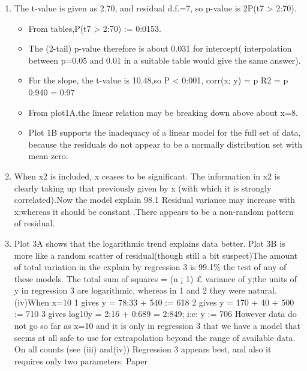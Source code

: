 \documentclass[a4paper,12pt]{article}
\begin{document}
\begin{enumerate}
    \item The t-value is given as 2.70, and residual d.f.=7, so p-value is 2P(t7 > 2:70).
    \begin{itemize}
        \item From tables,P(t7 > 2:70)
:=
0:0153.
    \end{itemize}
\begin{itemize}
    \item The (2-tail) p-value therefore is about 0.031 for intercept(
interpolation between p=0.05 and 0.01 in a suitable table would give the same
answer).
\item For the slope, the t-value is 10.48,so P < 0:001, corr(x; y) =
p
R2 =
p
0:940 = 0:97

\item From plot1A,the linear relation may be breaking down above about x=8. 
\item Plot 1B supports
the inadequacy of a linear model for the full set of data, because the residuals do not appear to be a normally distribution set with mean zero.
\end{itemize}

\item When x2 is included, x ceases to be significant. The information in x2 is clearly
taking up that previously given by x (with which it is strongly correlated).Now the model
explain 98.1%
Residual variance may increase with x;whereas it should be constant .There appears to
be a non-random pattern of residual.
\item Plot 3A shows that the logarithmic trend explains data better. Plot 3B is more
like a random scatter of residual(though still a bit suspect)The amount of total variation
in the explain by regression 3 is 99.1\% the test of any of these models.
The total sum of squares = (n ¡ 1) £ variance of y;the units of y in regression 3 are
logarithmic, whereas in 1 and 2 they were natural.
(iv)When x=10
1 gives y = 78:33 + 540
:=
618
2 gives y = 170 + 40 + 500
:=
710
3 gives log10y = 2:16 + 0:689 = 2:849; i:e: y
:=
706
However data do not go so far as x=10 and it is only in regression 3 that we have a
model that seems at all safe to use for extrapolation beyond the range of available data.
On all counts (see (iii) and(iv)) Regression 3 appears best, and also it requires only two
parameters.
Paper
\end{enumerate}
\end{document}
